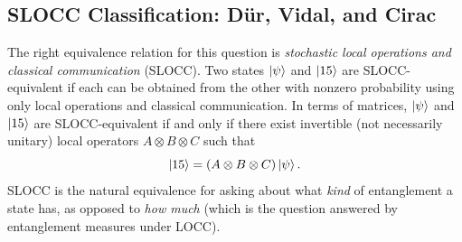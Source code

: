 \documentclass[12pt, a4paper, oneside]{report}
\theoremstyle{plain}
\theoremstyle{definition}
\theoremstyle{remark}
\begin{document}
\subsection{SLOCC Classification: Dür, Vidal, and Cirac}

The right equivalence relation for this question is \emph{stochastic local operations and
	classical communication} (SLOCC). Two states $\ket{\psi}$ and $\ket{15}$ are
SLOCC-equivalent if each can be obtained from the other with nonzero probability using only
local operations and classical communication. In terms of matrices, $\ket{\psi}$ and
$\ket{15}$ are SLOCC-equivalent if and only if there exist invertible (not necessarily
unitary) local operators $A \otimes B \otimes C$ such that
\[
	\ket{15} = (A \otimes B \otimes C)\ket{\psi}.
\]
SLOCC is the natural equivalence for asking about what \emph{kind} of entanglement a state
has, as opposed to \emph{how much} (which is the question answered by entanglement measures
under LOCC).
\end{document}
